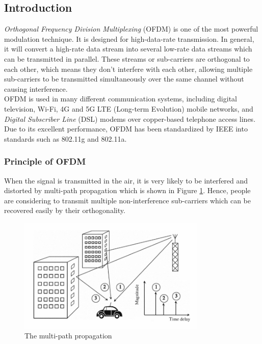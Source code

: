 \documentclass{article}
\begin{document}
\subsection{Introduction}
\textit{Orthogonal Frequency Division Multiplexing} (OFDM) is one of the most powerful modulation technique. It is designed for high-data-rate transmission. In general, it will convert a high-rate data stream into several low-rate data streams which can be transmitted in parallel\cite{RN79}. These streams or sub-carriers are orthogonal to each other, which means they don't interfere with each other, allowing multiple sub-carriers to be transmitted simultaneously over the same channel without causing interference.\\
OFDM is used in many different communication systems, including digital television, Wi-Fi, 4G and 5G LTE (Long-term Evolution) mobile networks, and \textit{Digital Subscriber Line} (DSL) modems over copper-based telephone access lines. Due to its excellent performance, OFDM has been standardized by IEEE into standards such as 802.11g and 802.11a\cite{RN79}.

\subsubsection{Principle of OFDM}
When the signal is transmitted in the air, it is very likely to be interfered and distorted by multi-path propagation which is shown in Figure \ref{fig:multipath propagation}. Hence, people are considering to transmit multiple non-interference sub-carriers which can be recovered easily by their orthogonality.

\begin{figure}[!h]
\centering
\includegraphics[width=0.8\textwidth]{images/multipath propagation.png}
\caption{\label{fig:multipath propagation}The multi-path propagation}
\end{figure}
\end{document}
